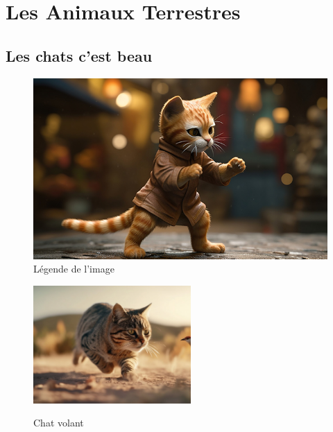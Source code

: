 \section{Les Animaux Terrestres}
\subsection{Les chats c'est beau}
\lipsum[1]

\begin{figure}[htbp]
  \centering
  \includegraphics[width=\textwidth]{paper/figures/chat1}
  \caption{Légende de l'image}
  \label{fig:chat1}
\end{figure}

\lipsum[2]

\begin{figure}[ht]
  \noindent
  \begin{minipage}{.6\textwidth}
    \lipsum[3]
  \end{minipage}
  \hfill
  \begin{minipage}{.35\textwidth}
    \centering
    \includegraphics[width=6cm]{paper/figures/chat2}\\
    \caption{Chat volant}
    \label{fig:chat2}
  \end{minipage}
\end{figure}





